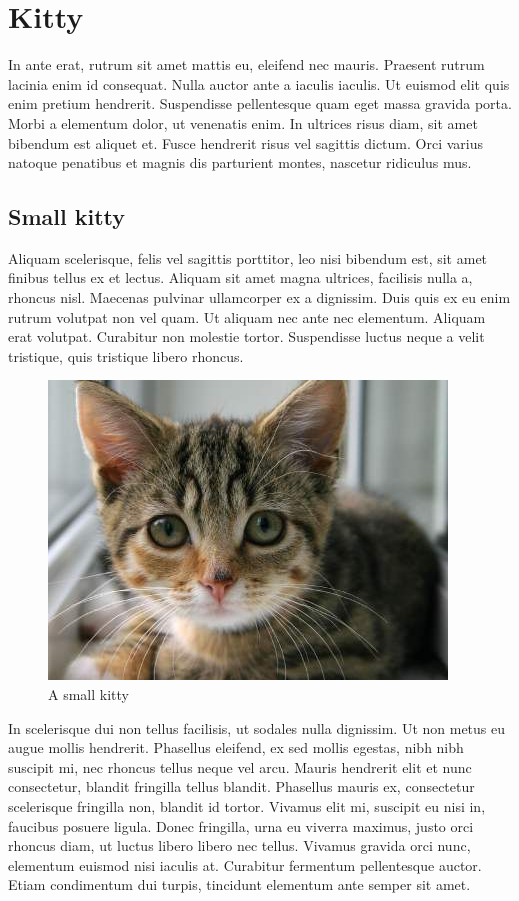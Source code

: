 \section{Kitty}

 In ante erat, rutrum sit amet mattis eu, eleifend nec mauris. Praesent rutrum lacinia enim id consequat. Nulla auctor ante a iaculis iaculis. Ut euismod elit quis enim pretium hendrerit. Suspendisse pellentesque quam eget massa gravida porta. Morbi a elementum dolor, ut venenatis enim. In ultrices risus diam, sit amet bibendum est aliquet et. Fusce hendrerit risus vel sagittis dictum. Orci varius natoque penatibus et magnis dis parturient montes, nascetur ridiculus mus.
 
\subsection{Small kitty}

 Aliquam scelerisque, felis vel sagittis porttitor, leo nisi bibendum est, sit amet finibus tellus ex et lectus. Aliquam sit amet magna ultrices, facilisis nulla a, rhoncus nisl. Maecenas pulvinar ullamcorper ex a dignissim. Duis quis ex eu enim rutrum volutpat non vel quam. Ut aliquam nec ante nec elementum. Aliquam erat volutpat. Curabitur non molestie tortor. Suspendisse luctus neque a velit tristique, quis tristique libero rhoncus.

\begin{figure}[!htbp]
\centering
\includegraphics[scale=0.4]{images/kitty.jpg}
\caption{A small kitty}
\label{fig:kitty.jpg}
\end{figure}

 In scelerisque dui non tellus facilisis, ut sodales nulla dignissim. Ut non metus eu augue mollis hendrerit. Phasellus eleifend, ex sed mollis egestas, nibh nibh suscipit mi, nec rhoncus tellus neque vel arcu. Mauris hendrerit elit et nunc consectetur, blandit fringilla tellus blandit. Phasellus mauris ex, consectetur scelerisque fringilla non, blandit id tortor. Vivamus elit mi, suscipit eu nisi in, faucibus posuere ligula. Donec fringilla, urna eu viverra maximus, justo orci rhoncus diam, ut luctus libero libero nec tellus. Vivamus gravida orci nunc, elementum euismod nisi iaculis at. Curabitur fermentum pellentesque auctor. Etiam condimentum dui turpis, tincidunt elementum ante semper sit amet.

